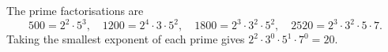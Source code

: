 The prime factorisations are
\[500=2^2\cdot5^3,\quad 1200=2^4\cdot3\cdot5^2,\quad 1800=2^3\cdot3^2\cdot5^2,\quad 2520=2^3\cdot3^2\cdot5\cdot7.\]
Taking the smallest exponent of each prime gives $2^2\cdot3^0\cdot5^1\cdot7^0=\boxed{20}$.
